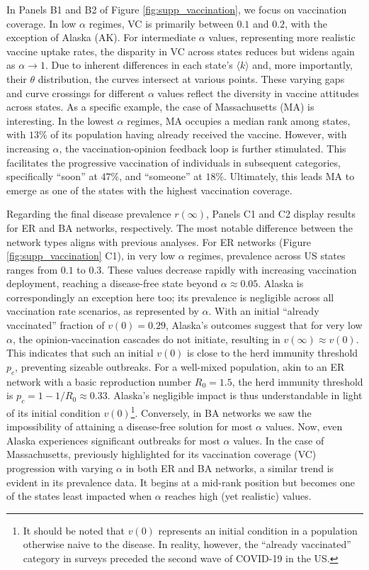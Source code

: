\documentclass[
 reprint,
 amsmath,amssymb,
 aps,
]{revtex4-2}
\begin{document}
In Panels B1 and B2 of Figure \ref{fig:supp_vaccination}, we focus on vaccination coverage. In low $\alpha$ regimes, VC is primarily between $0.1$ and $0.2$, with the exception of Alaska (AK). For intermediate $\alpha$ values, representing more realistic vaccine uptake rates, the disparity in VC across states reduces but widens again as $\alpha\to 1$. Due to inherent differences in each state's $\langle k\rangle$ and, more importantly, their $\theta$ distribution, the curves intersect at various points. These varying gaps and curve crossings for different $\alpha$ values reflect the diversity in vaccine attitudes across states. As a specific example, the case of Massachusetts (MA) is interesting. In the lowest $\alpha$ regimes, MA occupies a median rank among states, with $13\%$ of its population having already received the vaccine. However, with increasing $\alpha$, the vaccination-opinion feedback loop is further stimulated. This facilitates the progressive vaccination of individuals in subsequent categories, specifically ``soon'' at $47\%$, and ``someone'' at $18\%$. Ultimately, this leads MA to emerge as one of the states with the highest vaccination coverage.

Regarding the final disease prevalence $r(\infty)$, Panels C1 and C2 display results for ER and BA networks, respectively. The most notable difference between the network types aligns with previous analyses. For ER networks (Figure \ref{fig:supp_vaccination} C1), in very low $\alpha$ regimes, prevalence across US states ranges from $0.1$ to $0.3$. These values decrease rapidly with increasing vaccination deployment, reaching a disease-free state beyond $\alpha\approx 0.05$. Alaska is correspondingly an exception here too; its prevalence is negligible across all vaccination rate scenarios, as represented by $\alpha$. With an initial ``already vaccinated'' fraction of $v(0)=0.29$, Alaska's outcomes suggest that for very low $\alpha$, the opinion-vaccination cascades do not initiate, resulting in $v(\infty)\approx v(0)$. This indicates that such an initial $v(0)$ is close to the herd immunity threshold $p_{c}$, preventing sizeable outbreaks. For a well-mixed population, akin to an ER network with a basic reproduction number $R_0=1.5$, the herd immunity threshold is $p_c=1-1/R_0\approx 0.33$. Alaska's negligible impact is thus understandable in light of its initial condition $v(0)$\footnote{It should be noted that $v(0)$ represents an initial condition in a population otherwise naive to the disease. In reality, however, the ``already vaccinated'' category in surveys preceded the second wave of COVID-19 in the US.}. Conversely, in BA networks we saw the impossibility of attaining a disease-free solution for most $\alpha$ values. Now, even Alaska experiences significant outbreaks for most $\alpha$ values. In the case of Massachusetts, previously highlighted for its vaccination coverage (VC) progression with varying $\alpha$ in both ER and BA networks, a similar trend is evident in its prevalence data. It begins at a mid-rank position but becomes one of the states least impacted when $\alpha$ reaches high (yet realistic) values.
\end{document}
